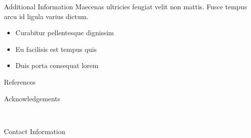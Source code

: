 \documentclass[final]{beamer}
\newlength{\onecolwid}
\begin{document}
\begin{frame}[t]
\begin{columns}[t]
\begin{column}{\onecolwid}
\begin{block}{Additional Information}
Maecenas ultricies feugiat velit non mattis. Fusce tempus arcu id ligula varius dictum. 
\begin{itemize}
\item Curabitur pellentesque dignissim
\item Eu facilisis est tempus quis
\item Duis porta consequat lorem
\end{itemize}

\end{block}


\begin{block}{References}

\nocite{*} %
\small{
\vspace{0.75in}}

\end{block}



\begin{block}{Acknowledgements}

\small{} \\

\end{block}



\begin{alertblock}{Contact Information}


\end{alertblock}
\end{column}
\end{columns}
\end{frame}
\end{document}
